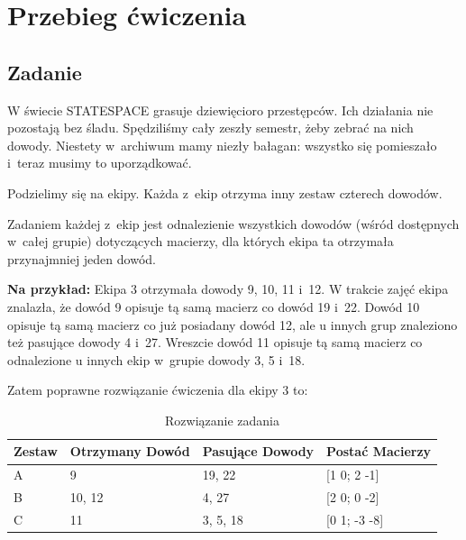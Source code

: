 \documentclass{sprawozdanie-agh}
\begin{document}

\stronatytulowa{}

\section{Przebieg ćwiczenia}
\subsection{Zadanie}

\par
W świecie STATESPACE grasuje dziewięcioro przestępców. Ich działania nie pozostają bez śladu. Spędziliśmy cały zeszły semestr, żeby zebrać na nich dowody. Niestety w~archiwum mamy niezły bałagan: wszystko się pomieszało i~teraz musimy to uporządkować.
\vspace{0.5cm}
\par
Podzielimy się na ekipy. Każda z~ekip otrzyma inny zestaw czterech dowodów. 
\vspace{0.5cm}
\par
Zadaniem każdej z~ekip jest odnalezienie wszystkich dowodów (wśród   dostępnych w~całej grupie) dotyczących macierzy, dla których ekipa ta otrzymała przynajmniej jeden dowód.
\vspace{0.5cm}
\par
\textbf{Na przykład:}
Ekipa 3 otrzymała dowody 9, 10, 11 i~12. W trakcie zajęć ekipa znalazła, że dowód 9 opisuje tą samą macierz co dowód 19 i~22. Dowód 10 opisuje tą samą macierz co już posiadany dowód 12, ale u innych grup znaleziono też pasujące dowody 4 i~27. Wreszcie dowód 11 opisuje tą samą macierz co odnalezione u innych ekip w~grupie dowody 3, 5 i~18.
\vspace{0.5cm}
\par
Zatem poprawne rozwiązanie ćwiczenia dla ekipy 3 to:
\begin{table}[h]
\caption{Rozwiązanie zadania}
\centering
\begin{tabular}{| m{2cm} | m{3cm}| m{3cm} | m{3cm} |}
\hline
Zestaw & Otrzymany Dowód & Pasujące Dowody & Postać Macierzy  \\
\hline
A      & 9               & 19, 22          & {[}1 0; 2 -1{]}  \\
\hline
B      & 10, 12          & 4, 27           & {[}2 0; 0 -2{]}  \\
\hline
C      & 11              & 3, 5, 18        & {[}0 1; -3 -8{]} \\
\hline
\end{tabular}
\label{tab:przyklad}
\end{table}
\end{document}
